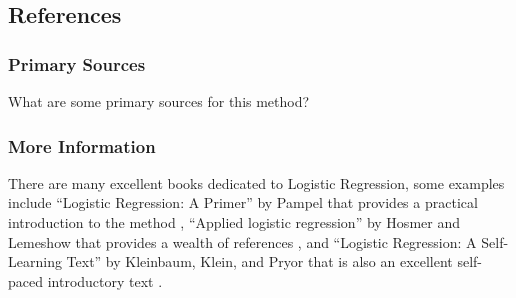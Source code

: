 \subsection{References}

\subsubsection{Primary Sources}

What are some primary sources for this method?

\subsubsection{More Information}

There are many excellent books dedicated to Logistic Regression, some examples include 
``Logistic Regression: A Primer'' by Pampel that provides a practical introduction to the method \cite{Pampel2000}, ``Applied logistic regression'' by Hosmer and Lemeshow that provides a wealth of references \cite{Hosmer2000}, and ``Logistic Regression: A Self-Learning Text'' by Kleinbaum, Klein, and Pryor that is also an excellent self-paced introductory text \cite{Kleinbaum2010}.


